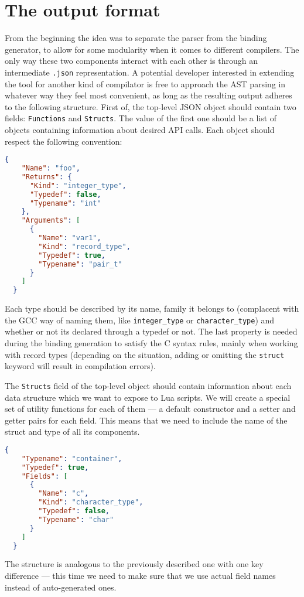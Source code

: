\documentclass[polish, english]{iithesis}
\begin{document}
  \section{The output format}
From the beginning the idea was to separate the parser from the binding generator, to allow for some modularity when it comes to different compilers.
The only way these two components interact with each other is through an intermediate \texttt{.json} representation.
A potential developer interested in extending the tool for another kind of compilator is free to approach the AST parsing in whatever way they feel most convenient, as long as the resulting output adheres to the following structure.
First of, the top-level JSON object should contain two fields: \texttt{Functions} and \texttt{Structs}. 
The value of the first one should be a list of objects containing information about desired API calls.
Each object should respect the following convention:
\begin{lstlisting}[language=json, caption=Example API \texttt{.json} function description]
  {
    "Name": "foo",
    "Returns": {
      "Kind": "integer_type",
      "Typedef": false,
      "Typename": "int"
    },
    "Arguments": [
      {
        "Name": "var1",
        "Kind": "record_type",
        "Typedef": true,
        "Typename": "pair_t"
      }
    ]
  }
\end{lstlisting}
Each type should be described by its name, family it belongs to (complacent with the GCC way of naming them, like \texttt{integer\_type} or \texttt{character\_type}) and whether or not its declared through a typedef or not.
The last property is needed during the binding generation to satisfy the C syntax rules, mainly when working with record types (depending on the situation, adding or omitting the \texttt{struct} keyword will result in compilation errors).

The \texttt{Structs} field of the top-level object should contain information about each data structure which we want to expose to Lua scripts.
We will create a special set of utility functions for each of them --- a default constructor and a setter and getter pairs for each field.
This means that we need to include the name of the struct and type of all its components.
\begin{lstlisting}[language=json, caption=Example \texttt{Structs} array entry]
  {
    "Typename": "container",
    "Typedef": true,
    "Fields": [
      {
        "Name": "c",
        "Kind": "character_type",
        "Typedef": false,
        "Typename": "char"
      }
    ]
  }
\end{lstlisting}
The structure is analogous to the previously described one with one key difference --- this time we need to make sure that we use actual field names instead of auto-generated ones. 
\end{document}
